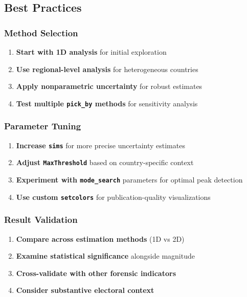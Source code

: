 \documentclass{article}
\begin{document}
\subsection{Best Practices}

\subsubsection{Method Selection}
\begin{enumerate}
    \item \textbf{Start with 1D analysis} for initial exploration
    \item \textbf{Use regional-level analysis} for heterogeneous countries
    \item \textbf{Apply nonparametric uncertainty} for robust estimates
    \item \textbf{Test multiple \texttt{pick\_by} methods} for sensitivity analysis
\end{enumerate}

\subsubsection{Parameter Tuning}
\begin{enumerate}
    \item \textbf{Increase \texttt{sims}} for more precise uncertainty estimates
    \item \textbf{Adjust \texttt{MaxThreshold}} based on country-specific context
    \item \textbf{Experiment with \texttt{mode\_search}} parameters for optimal peak detection
    \item \textbf{Use custom \texttt{setcolors}} for publication-quality visualizations
\end{enumerate}

\subsubsection{Result Validation}
\begin{enumerate}
    \item \textbf{Compare across estimation methods} (1D vs 2D)
    \item \textbf{Examine statistical significance} alongside magnitude
    \item \textbf{Cross-validate with other forensic indicators}
    \item \textbf{Consider substantive electoral context}
\end{enumerate}
\end{document}
